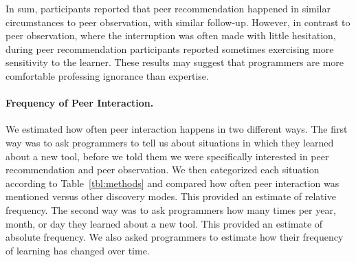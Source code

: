 \documentclass[smallextended]{svjour3}
\newcommand\discovery{peer interaction\xspace}
\newcommand\DisCovery{Peer Interaction\xspace}
\newcommand\discpush{peer recommendation\xspace}
\newcommand\discpull{peer observation\xspace}
\newcommand\contexts{modes\xspace}
\begin{document}
% 
% 

In sum, participants reported that \discpush happened in similar
circumstances to \discpull, with similar follow-up.
However, in contrast to \discpull, where the interruption was often
made with little hesitation, during \discpush 
participants reported sometimes exercising more sensitivity to the learner.
These results may suggest that programmers are more comfortable professing
ignorance than expertise.

\paragraph{Frequency of \DisCovery.}\label{sec:frequency}

\noindent
We estimated how often \discovery happens in two different ways.
The first way was to ask programmers to tell us about situations in which
they learned about a new tool, before we told them
we were specifically interested in \discpush and \discpull.
We then categorized each situation according to
Table~\ref{tbl:methods} and compared how often \discovery was
mentioned versus other discovery \contexts. 
This provided an estimate of relative frequency.
The second way was to ask programmers how many times per year, month, or day
they learned about a new tool.
This provided an estimate of absolute frequency.
We also asked programmers to estimate how their frequency of learning has
changed over time.
\end{document}
